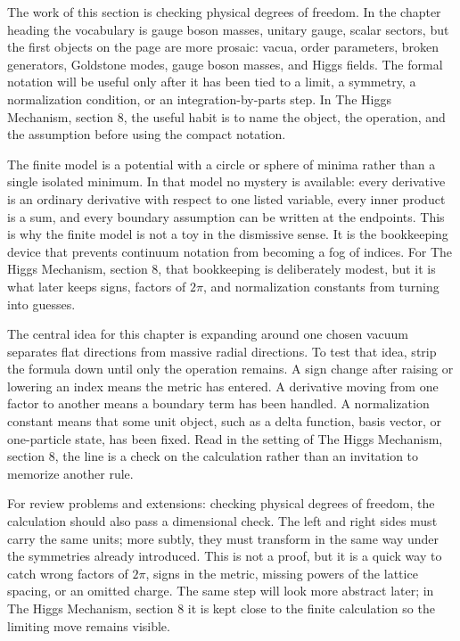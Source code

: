 The work of this section is checking physical degrees of freedom.  In the chapter heading the vocabulary is gauge boson masses, unitary gauge, scalar sectors, but the first objects on the page are more prosaic: vacua, order parameters, broken generators, Goldstone modes, gauge boson masses, and Higgs fields.  The formal notation will be useful only after it has been tied to a limit, a symmetry, a normalization condition, or an integration-by-parts step.  In The Higgs Mechanism, section 8, the useful habit is to name the object, the operation, and the assumption before using the compact notation.

The finite model is a potential with a circle or sphere of minima rather than a single isolated minimum.  In that model no mystery is available: every derivative is an ordinary derivative with respect to one listed variable, every inner product is a sum, and every boundary assumption can be written at the endpoints.  This is why the finite model is not a toy in the dismissive sense.  It is the bookkeeping device that prevents continuum notation from becoming a fog of indices.  For The Higgs Mechanism, section 8, that bookkeeping is deliberately modest, but it is what later keeps signs, factors of \(2\pi\), and normalization constants from turning into guesses.

The central idea for this chapter is expanding around one chosen vacuum separates flat directions from massive radial directions.  To test that idea, strip the formula down until only the operation remains.  A sign change after raising or lowering an index means the metric has entered.  A derivative moving from one factor to another means a boundary term has been handled.  A normalization constant means that some unit object, such as a delta function, basis vector, or one-particle state, has been fixed.  Read in the setting of The Higgs Mechanism, section 8, the line is a check on the calculation rather than an invitation to memorize another rule.

For review problems and extensions: checking physical degrees of freedom, the calculation should also pass a dimensional check.  The left and right sides must carry the same units; more subtly, they must transform in the same way under the symmetries already introduced.  This is not a proof, but it is a quick way to catch wrong factors of \(2\pi\), signs in the metric, missing powers of the lattice spacing, or an omitted charge.  The same step will look more abstract later; in The Higgs Mechanism, section 8 it is kept close to the finite calculation so the limiting move remains visible.

